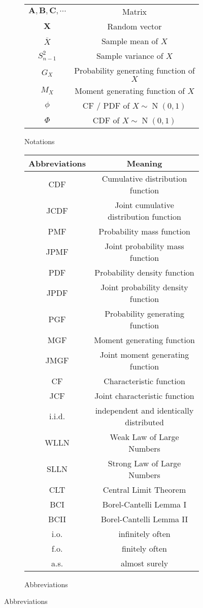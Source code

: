 \documentclass{huhtakm-template-book}
\DeclareMathOperator{\N}{N}
\begin{document}
\begin{figure}[h]
\begin{subfigure}{0.45\textwidth}
\begin{tabular}{cc}
			$\mathbf{A},\mathbf{B},\mathbf{C},\cdots$ & Matrix\\
			$\mathbf{X}$ & Random vector\\
			$\overline{X}$ & Sample mean of $X$\\
			$S_{n-1}^{2}$ & Sample variance of $X$\\
			$G_{X}$ & Probability generating function of $X$\\
			$M_{X}$ & Moment generating function of $X$\\
			$\phi$ & CF / PDF of $X\sim\N(0,1)$\\
			$\Phi$ & CDF of $X\sim\N(0,1)$
		\end{tabular}
		\caption{Notations}
	\end{subfigure}
	\begin{subfigure}{0.45\textwidth}
		\centering
		\begin{tabular}{cc}
			Abbreviations & Meaning\\
			\hline
			CDF & Cumulative distribution function\\
			JCDF & Joint cumulative distribution function\\
			PMF & Probability mass function\\
			JPMF & Joint probability mass function\\
			PDF & Probability density function\\
			JPDF & Joint probability density function\\
			PGF & Probability generating function\\
			MGF & Moment generating function\\
			JMGF & Joint moment generating function\\
			CF & Characteristic function\\
			JCF & Joint characteristic function\\
			i.i.d. & independent and identically distributed\\
			WLLN & Weak Law of Large Numbers\\
			SLLN & Strong Law of Large Numbers\\
			CLT & Central Limit Theorem\\
			BCI & Borel-Cantelli Lemma I\\
			BCII & Borel-Cantelli Lemma II\\
			i.o. & infinitely often\\
			f.o. & finitely often\\
			a.s. & almost surely
		\end{tabular}
		\caption{Abbreviations}
	\end{subfigure}
\end{figure}
\end{document}
